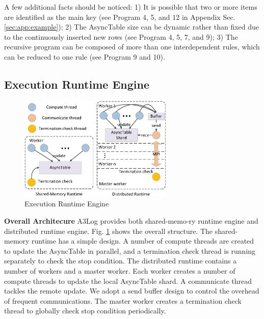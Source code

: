 A few additional facts should be noticed: 1) It is possible that two or more items are identified as the main key (see Program 4, 5, and 12 in Appendix Sec. \ref{sec:app:example}); 2) The AsyncTable size can be dynamic rather than fixed due to the continuously inserted new rows (see Program 4, 5, 7, and 9); 3) The recursive program can be composed of more than one interdependent rules, which can be reduced to one rule (see Program 9 and 10).

\subsection{Execution Runtime Engine}
\label{sec:system:runtime}

\begin{figure}[!t]
    \centering
  \includegraphics[width=2.9in]{fig/runtime}
  \vspace{-0.1in}
  \caption{Execution Runtime Engine}
  \label{fig:runtime}
  \vspace{-0.1in}
\end{figure}

\noindent\textbf{Overall Architecure}
A3Log provides both shared-memo-ry runtime engine and distributed runtime engine. Fig. \ref{fig:runtime} shows the overall structure. The shared-memory runtime has a simple design. A number of compute threads are created to update the AsyncTable in parallel, and a termination check thread is running separately to check the stop condition. The distributed runtime contains a number of workers and a master worker. Each worker creates a number of compute threads to update the local AsyncTable shard. A communicate thread tackles the remote update. We adopt a send buffer design to control the overhead of frequent communications. The master worker creates a termination check thread to globally check stop condition periodically.


